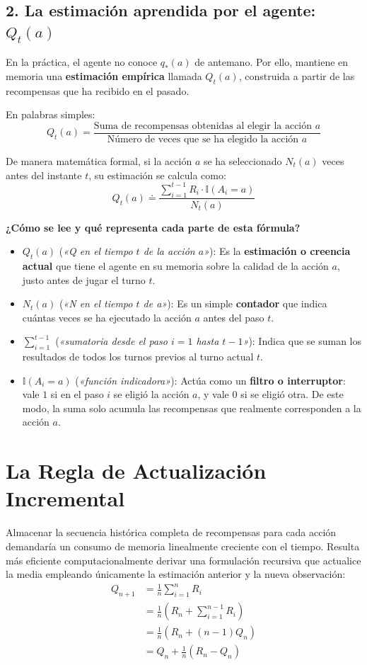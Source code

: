 \subsection*{2. La estimación aprendida por el agente: $Q_t(a)$}
En la práctica, el agente no conoce $q_*(a)$ de antemano. Por ello, mantiene en memoria una \textbf{estimación empírica} llamada $Q_t(a)$, construida a partir de las recompensas que ha recibido en el pasado.

\noindent En palabras simples:
\begin{equation*}
  Q_t(a) = \frac{\text{Suma de recompensas obtenidas al elegir la acción } a}{\text{Número de veces que se ha elegido la acción } a}
\end{equation*}

\noindent De manera matemática formal, si la acción $a$ se ha seleccionado $N_t(a)$ veces antes del instante $t$, su estimación se calcula como:
\begin{equation}
  Q_t(a) \doteq \frac{\sum_{i=1}^{t-1} R_i \cdot \mathbb{I}(A_i = a)}{N_t(a)}
\end{equation}

\noindent \textbf{¿Cómo se lee y qué representa cada parte de esta fórmula?}
\begin{itemize}
  \item $Q_t(a)$ (\textit{«Q en el tiempo $t$ de la acción $a$»}): Es la \textbf{estimación o creencia actual} que tiene el agente en su memoria sobre la calidad de la acción $a$, justo antes de jugar el turno $t$.
  \item $N_t(a)$ (\textit{«N en el tiempo $t$ de a»}): Es un simple \textbf{contador} que indica cuántas veces se ha ejecutado la acción $a$ antes del paso $t$.
  \item $\sum_{i=1}^{t-1}$ (\textit{«sumatoria desde el paso $i=1$ hasta $t-1$»}): Indica que se suman los resultados de todos los turnos previos al turno actual $t$.
  \item $\mathbb{I}(A_i = a)$ (\textit{«función indicadora»}): Actúa como un \textbf{filtro o interruptor}: vale $1$ si en el paso $i$ se eligió la acción $a$, y vale $0$ si se eligió otra. De este modo, la suma solo acumula las recompensas que realmente corresponden a la acción $a$.
\end{itemize}

\section{La Regla de Actualización Incremental}
Almacenar la secuencia histórica completa de recompensas para cada acción demandaría un consumo de memoria linealmente creciente con el tiempo. Resulta más eficiente computacionalmente derivar una formulación recursiva que actualice la media empleando únicamente la estimación anterior y la nueva observación:
\begin{align*}
  Q_{n+1} &= \frac{1}{n} \sum_{i=1}^n R_i \\
  &= \frac{1}{n} \left( R_n + \sum_{i=1}^{n-1} R_i \right) \\
  &= \frac{1}{n} \left( R_n + (n-1) Q_n \right) \\
  &= Q_n + \frac{1}{n} \left( R_n - Q_n \right)
\end{align*}

